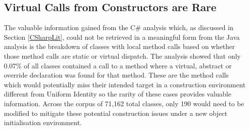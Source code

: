 \subsection{Virtual Calls from Constructors are Rare}
The valuable information gained from the C\# analysis which, as discussed in Section \ref{CSharpLit}, could not be retrieved in a meaningful form from the Java analysis is the breakdown of classes with local method calls based on whether those method calls are static or virtual dispatch. The analysis showed that only 0.07\% of all classes contained a call to a method where a virtual, abstract or override declaration was found for that method. These are the method calls which would potentially miss their intended target in a construction environment different from Uniform Identity so the rarity of these cases provides valuable information. Across the corpus of 71,162 total classes, only 190 would need to be modified to mitigate these potential construction issues under a new object initialisation environment.
\newline


